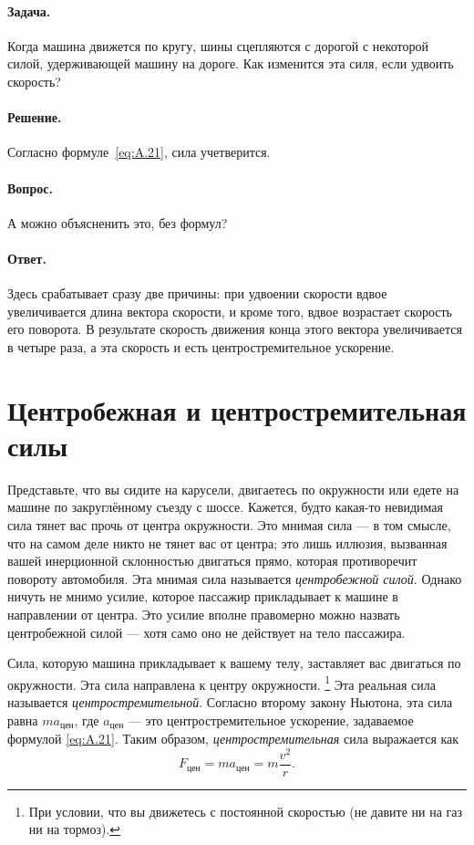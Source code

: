 \paragraph{Задача.}
Когда машина движется по кругу, шины сцепляются с дорогой с некоторой силой, удерживающей машину на дороге.
Как изменится эта силя, если удвоить скорость?

\paragraph{Решение.}
Согласно формуле~\eqref{eq:A.21}, сила учетверится.

\paragraph{Вопрос.}
А можно объясненить это, без формул?

\paragraph{Ответ.}
Здесь срабатывает сразу две причины:
при удвоении скорости вдвое увеличивается длина вектора скорости, и кроме того, вдвое возрастает скорость его поворота.
В результате скорость движения конца этого вектора увеличивается в четыре раза, а эта скорость и есть центростремительное ускорение.

\section{Центробежная и центростремительная силы}\label{Центробежная и центростремительная силы}

Представьте, что вы сидите на карусели, двигаетесь по окружности или едете на машине по закруглённому съезду с шоссе.
Кажется, будто какая-то невидимая сила тянет вас прочь от центра окружности.
Это мнимая сила --- в том смысле, что на самом деле никто не тянет вас от центра; это лишь иллюзия, вызванная вашей инерционной склонностью двигаться прямо, которая противоречит повороту автомобиля.
Эта мнимая сила называется \emph{центробежной силой}.
Однако ничуть не мнимо усилие, которое пассажир прикладывает к машине в направлении от центра.
Это усилие вполне правомерно можно назвать центробежной силой --- хотя само оно не действует на тело пассажира.

Сила, которую машина прикладывает к вашему телу, заставляет вас двигаться по окружности.
Эта сила направлена к центру окружности.%
\footnote{При условии, что вы движетесь с постоянной скоростью (не давите ни на газ ни на тормоз).}
Эта реальная сила называется \emph{центростремительной}.
Согласно второму закону Ньютона, эта сила равна $ma_{\text{цен}}$, где $a_{\text{цен}}$ --- это центростремительное ускорение, задаваемое формулой \eqref{eq:A.21}.
Таким образом, \emph{центростремительная} сила выражается как
\[F_{\text{цен}}=ma_{\text{цен}}=m\frac{v^2}{r}.\]

